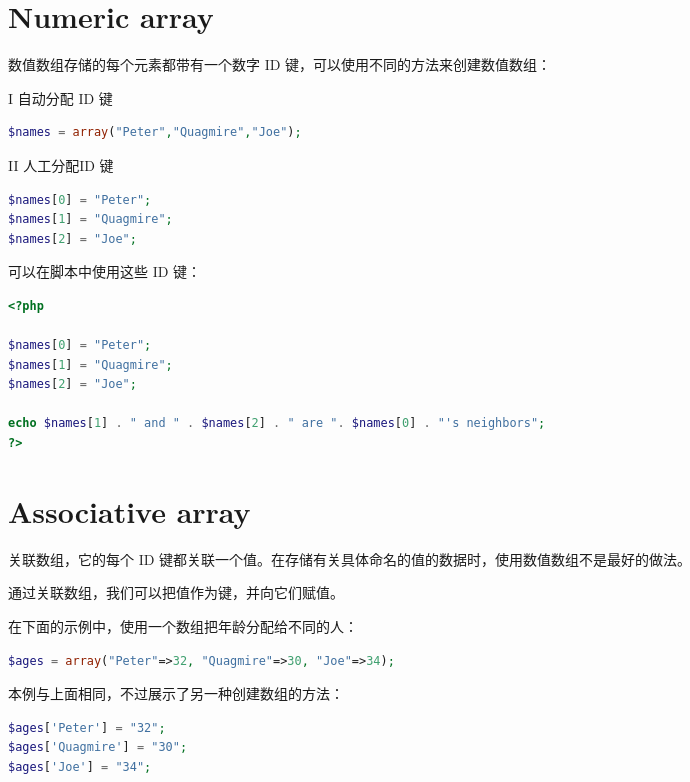 \section{Numeric array}

数值数组存储的每个元素都带有一个数字 ID 键，可以使用不同的方法来创建数值数组：

\begin{compactenum}
\item[I] 自动分配 ID 键

\begin{lstlisting}[language=PHP]
$names = array("Peter","Quagmire","Joe");
\end{lstlisting}

\item[II] 人工分配ID 键

\begin{lstlisting}[language=PHP]
$names[0] = "Peter";
$names[1] = "Quagmire";
$names[2] = "Joe";
\end{lstlisting}

可以在脚本中使用这些 ID 键：


\begin{lstlisting}[language=PHP]
<?php

$names[0] = "Peter";
$names[1] = "Quagmire";
$names[2] = "Joe";

echo $names[1] . " and " . $names[2] . " are ". $names[0] . "'s neighbors";
?>
\end{lstlisting}


\end{compactenum}





\section{Associative array}


关联数组，它的每个 ID 键都关联一个值。在存储有关具体命名的值的数据时，使用数值数组不是最好的做法。

通过关联数组，我们可以把值作为键，并向它们赋值。

在下面的示例中，使用一个数组把年龄分配给不同的人：


\begin{lstlisting}[language=PHP]
$ages = array("Peter"=>32, "Quagmire"=>30, "Joe"=>34);
\end{lstlisting}

本例与上面相同，不过展示了另一种创建数组的方法：

\begin{lstlisting}[language=PHP]
$ages['Peter'] = "32";
$ages['Quagmire'] = "30";
$ages['Joe'] = "34";
\end{lstlisting}



